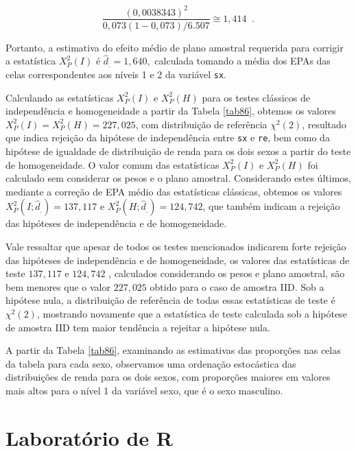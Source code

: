 \documentclass[]{book}
\numberwithin{example}{chapter}
\numberwithin{remark}{chapter}
\numberwithin{definition}{chapter}
\begin{document}
\[
\frac{\left( 0,0038343\right) ^{2}}{0,073\left( 1-0,073\right) /6.507}\cong
1,414\;\;. 
\]

Portanto, a estimativa do efeito médio de plano amostral requerida para
corrigir a estatística \(X_{P}^{2}\left( I\right)\) é
\(\hat{d}_{.}=1,640,\) calculada tomando a média dos EPAs das celas
correspondentes aos níveis 1 e 2 da variável \texttt{sx}.

Calculando as estatísticas \(X_{P}^{2}\left( I\right)\) e
\(X_{P}^{2}\left( H\right)\) para os testes clássicos de independência e
homogeneidade a partir da Tabela \ref{tab86}, obtemos os valores
\(X_{P}^{2}\left( I\right) =X_{P}^{2}\left( H\right) =227,025\), com
distribuição de referência \(\chi ^{2}\left( 2\right)\), resultado que
indica rejeição da hipótese de independência entre \texttt{sx} e
\texttt{re}, bem como da hipótese de igualdade de distribuição de renda
para os dois sexos a partir do teste de homogeneidade. O valor comum das
estatísticas \(X_{P}^{2}\left( I\right)\) e \(X_{P}^{2}\left( H\right)\)
foi calculado sem considerar os pesos e o plano amostral. Considerando
estes últimos, mediante a correção de EPA médio das estatísticas
clássicas, obtemos os valores
\(X_{P}^{2}\left( I;\hat{d} _{.}\right) =137,117\) e
\(X_{P}^{2}\left( H;\hat{d}_{.}\right) =124,742\), que também indicam a
rejeição das hipóteses de independência e de homogeneidade.

Vale ressaltar que apesar de todos os testes mencionados indicarem forte
rejeição das hipóteses de independência e de homogeneidade, os valores
das estatísticas de teste \(137,117\) e \(124,742\) , calculados
considerando os pesos e plano amostral, são bem menores que o valor
\(227,025\) obtido para o caso de amostra IID. Sob a hipótese nula, a
distribuição de referência de todas essas estatísticas de teste é
\(\chi ^{2}\left( 2\right)\), mostrando novamente que a estatística de
teste calculada sob a hipótese de amostra IID tem maior tendência a
rejeitar a hipótese nula.

A partir da Tabela \ref{tab86}, examinando as estimativas das proporções
nas celas da tabela para cada sexo, observamos uma ordenação estocástica
das distribuições de renda para os dois sexos, com proporções maiores em
valores mais altos para o nível 1 da variável sexo, que é o sexo
masculino.

\section{Laboratório de R}\label{laboratorio-de-r-5}
\end{document}
